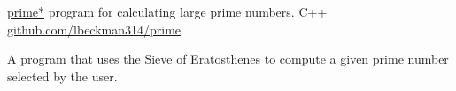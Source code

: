 \showoff
{\href{https://liambeckman.com/projects/prime}{prime*}}
{program for calculating large prime numbers.}
{C++}
{\href{https://github.com/lbeckman314/prime}{github.com/lbeckman314/prime}}

A program that uses the Sieve of Eratosthenes to compute a given prime number selected by the user.

\myBreak
